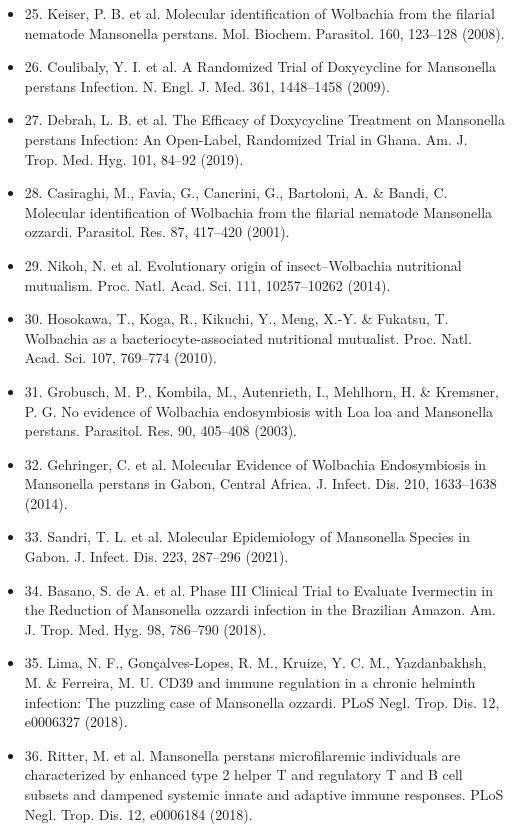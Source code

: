 \documentclass[10pt, a4paper, twocolumn]{article} %
\begin{document}
\begin{itemize}
\item 25.	Keiser, P. B. et al. Molecular identification of Wolbachia from the filarial nematode Mansonella perstans. Mol. Biochem. Parasitol. 160, 123–128 (2008).
\item 26.	Coulibaly, Y. I. et al. A Randomized Trial of Doxycycline for Mansonella perstans Infection. N. Engl. J. Med. 361, 1448–1458 (2009).
\item 27.	Debrah, L. B. et al. The Efficacy of Doxycycline Treatment on Mansonella perstans Infection: An Open-Label, Randomized Trial in Ghana. Am. J. Trop. Med. Hyg. 101, 84–92 (2019).
\item 28.	Casiraghi, M., Favia, G., Cancrini, G., Bartoloni, A. \& Bandi, C. Molecular identification of Wolbachia from the filarial nematode Mansonella ozzardi. Parasitol. Res. 87, 417–420 (2001).
\item 29.	Nikoh, N. et al. Evolutionary origin of insect–Wolbachia nutritional mutualism. Proc. Natl. Acad. Sci. 111, 10257–10262 (2014).
\item 30.	Hosokawa, T., Koga, R., Kikuchi, Y., Meng, X.-Y. \& Fukatsu, T. Wolbachia as a bacteriocyte-associated nutritional mutualist. Proc. Natl. Acad. Sci. 107, 769–774 (2010).
\item 31.	Grobusch, M. P., Kombila, M., Autenrieth, I., Mehlhorn, H. \& Kremsner, P. G. No evidence of Wolbachia endosymbiosis with Loa loa and Mansonella perstans. Parasitol. Res. 90, 405–408 (2003).
\item 32.	Gehringer, C. et al. Molecular Evidence of Wolbachia Endosymbiosis in Mansonella perstans in Gabon, Central Africa. J. Infect. Dis. 210, 1633–1638 (2014).
\item 33.	Sandri, T. L. et al. Molecular Epidemiology of Mansonella Species in Gabon. J. Infect. Dis. 223, 287–296 (2021).
\item 34.	Basano, S. de A. et al. Phase III Clinical Trial to Evaluate Ivermectin in the Reduction of Mansonella ozzardi infection in the Brazilian Amazon. Am. J. Trop. Med. Hyg. 98, 786–790 (2018).
\item 35.	Lima, N. F., Gonçalves-Lopes, R. M., Kruize, Y. C. M., Yazdanbakhsh, M. \& Ferreira, M. U. CD39 and immune regulation in a chronic helminth infection: The puzzling case of Mansonella ozzardi. PLoS Negl. Trop. Dis. 12, e0006327 (2018).
\item 36.	Ritter, M. et al. Mansonella perstans microfilaremic individuals are characterized by enhanced type 2 helper T and regulatory T and B cell subsets and dampened systemic innate and adaptive immune responses. PLoS Negl. Trop. Dis. 12, e0006184 (2018).

\end{itemize}
\end{document}
